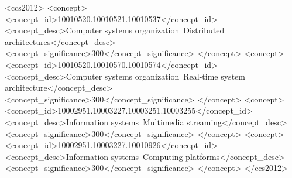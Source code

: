\documentclass[sigplan, 10pt, timestamp, screen]{acmart}
\begin{document}
\begin{CCSXML}
<ccs2012>
  <concept>
    <concept_id>10010520.10010521.10010537</concept_id>
    <concept_desc>Computer systems organization~Distributed architectures</concept_desc>
    <concept_significance>300</concept_significance>
  </concept>
  <concept>
    <concept_id>10010520.10010570.10010574</concept_id>
    <concept_desc>Computer systems organization~Real-time system architecture</concept_desc>
    <concept_significance>300</concept_significance>
  </concept>
  <concept>
    <concept_id>10002951.10003227.10003251.10003255</concept_id>
    <concept_desc>Information systems~Multimedia streaming</concept_desc>
    <concept_significance>300</concept_significance>
  </concept>
  <concept>
    <concept_id>10002951.10003227.10010926</concept_id>
    <concept_desc>Information systems~Computing platforms</concept_desc>
    <concept_significance>300</concept_significance>
  </concept>
</ccs2012>
\end{CCSXML}


\maketitle












\balance

\def \bibfont {\normalsize}

\end{document}
